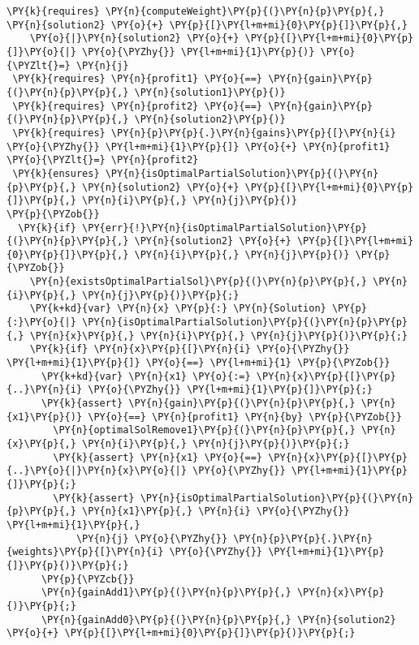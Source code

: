 \begin{sloppypar}
\begin{enumerate}
\begin{Verbatim}[commandchars=\\\{\}]
 \PY{k}{requires} \PY{n}{computeWeight}\PY{p}{(}\PY{n}{p}\PY{p}{,} \PY{n}{solution2} \PY{o}{+} \PY{p}{[}\PY{l+m+mi}{0}\PY{p}{]}\PY{p}{,} 
    \PY{o}{|}\PY{n}{solution2} \PY{o}{+} \PY{p}{[}\PY{l+m+mi}{0}\PY{p}{]}\PY{o}{|} \PY{o}{\PYZhy{}} \PY{l+m+mi}{1}\PY{p}{)} \PY{o}{\PYZlt{}=} \PY{n}{j}
 \PY{k}{requires} \PY{n}{profit1} \PY{o}{==} \PY{n}{gain}\PY{p}{(}\PY{n}{p}\PY{p}{,} \PY{n}{solution1}\PY{p}{)}
 \PY{k}{requires} \PY{n}{profit2} \PY{o}{==} \PY{n}{gain}\PY{p}{(}\PY{n}{p}\PY{p}{,} \PY{n}{solution2}\PY{p}{)}
 \PY{k}{requires} \PY{n}{p}\PY{p}{.}\PY{n}{gains}\PY{p}{[}\PY{n}{i} \PY{o}{\PYZhy{}} \PY{l+m+mi}{1}\PY{p}{]} \PY{o}{+} \PY{n}{profit1} \PY{o}{\PYZlt{}=} \PY{n}{profit2}
 \PY{k}{ensures} \PY{n}{isOptimalPartialSolution}\PY{p}{(}\PY{n}{p}\PY{p}{,} \PY{n}{solution2} \PY{o}{+} \PY{p}{[}\PY{l+m+mi}{0}\PY{p}{]}\PY{p}{,} \PY{n}{i}\PY{p}{,} \PY{n}{j}\PY{p}{)}
\PY{p}{\PYZob{}}
  \PY{k}{if} \PY{err}{!}\PY{n}{isOptimalPartialSolution}\PY{p}{(}\PY{n}{p}\PY{p}{,} \PY{n}{solution2} \PY{o}{+} \PY{p}{[}\PY{l+m+mi}{0}\PY{p}{]}\PY{p}{,} \PY{n}{i}\PY{p}{,} \PY{n}{j}\PY{p}{)} \PY{p}{\PYZob{}}
    \PY{n}{existsOptimalPartialSol}\PY{p}{(}\PY{n}{p}\PY{p}{,} \PY{n}{i}\PY{p}{,} \PY{n}{j}\PY{p}{)}\PY{p}{;}
    \PY{k+kd}{var} \PY{n}{x} \PY{p}{:} \PY{n}{Solution} \PY{p}{:}\PY{o}{|} \PY{n}{isOptimalPartialSolution}\PY{p}{(}\PY{n}{p}\PY{p}{,} \PY{n}{x}\PY{p}{,} \PY{n}{i}\PY{p}{,} \PY{n}{j}\PY{p}{)}\PY{p}{;}
    \PY{k}{if} \PY{n}{x}\PY{p}{[}\PY{n}{i} \PY{o}{\PYZhy{}} \PY{l+m+mi}{1}\PY{p}{]} \PY{o}{==} \PY{l+m+mi}{1} \PY{p}{\PYZob{}}
      \PY{k+kd}{var} \PY{n}{x1} \PY{o}{:=} \PY{n}{x}\PY{p}{[}\PY{p}{..}\PY{n}{i} \PY{o}{\PYZhy{}} \PY{l+m+mi}{1}\PY{p}{]}\PY{p}{;}
      \PY{k}{assert} \PY{n}{gain}\PY{p}{(}\PY{n}{p}\PY{p}{,} \PY{n}{x1}\PY{p}{)} \PY{o}{==} \PY{n}{profit1} \PY{n}{by} \PY{p}{\PYZob{}}
        \PY{n}{optimalSolRemove1}\PY{p}{(}\PY{n}{p}\PY{p}{,} \PY{n}{x}\PY{p}{,} \PY{n}{i}\PY{p}{,} \PY{n}{j}\PY{p}{)}\PY{p}{;}
        \PY{k}{assert} \PY{n}{x1} \PY{o}{==} \PY{n}{x}\PY{p}{[}\PY{p}{..}\PY{o}{|}\PY{n}{x}\PY{o}{|} \PY{o}{\PYZhy{}} \PY{l+m+mi}{1}\PY{p}{]}\PY{p}{;}
        \PY{k}{assert} \PY{n}{isOptimalPartialSolution}\PY{p}{(}\PY{n}{p}\PY{p}{,} \PY{n}{x1}\PY{p}{,} \PY{n}{i} \PY{o}{\PYZhy{}} \PY{l+m+mi}{1}\PY{p}{,} 
            \PY{n}{j} \PY{o}{\PYZhy{}} \PY{n}{p}\PY{p}{.}\PY{n}{weights}\PY{p}{[}\PY{n}{i} \PY{o}{\PYZhy{}} \PY{l+m+mi}{1}\PY{p}{]}\PY{p}{)}\PY{p}{;}
      \PY{p}{\PYZcb{}}
      \PY{n}{gainAdd1}\PY{p}{(}\PY{n}{p}\PY{p}{,} \PY{n}{x}\PY{p}{)}\PY{p}{;}
      \PY{n}{gainAdd0}\PY{p}{(}\PY{n}{p}\PY{p}{,} \PY{n}{solution2} \PY{o}{+} \PY{p}{[}\PY{l+m+mi}{0}\PY{p}{]}\PY{p}{)}\PY{p}{;}

\end{Verbatim}
\end{enumerate}
\end{sloppypar}

